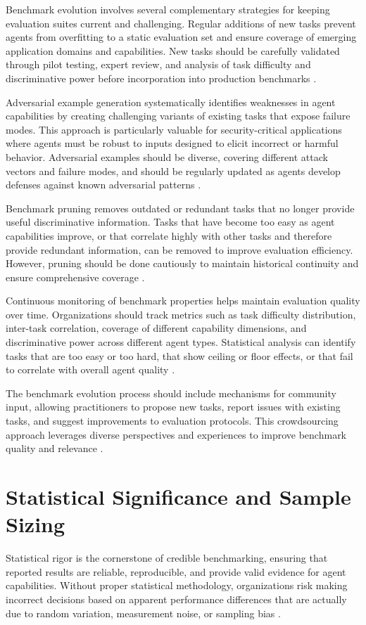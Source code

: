 \begin{TNtwocol}
Benchmark evolution involves several complementary strategies for keeping evaluation suites current and challenging. Regular additions of new tasks prevent agents from overfitting to a static evaluation set and ensure coverage of emerging application domains and capabilities. New tasks should be carefully validated through pilot testing, expert review, and analysis of task difficulty and discriminative power before incorporation into production benchmarks \cite{kiela2021,liu2023,reimers2017}.

Adversarial example generation systematically identifies weaknesses in agent capabilities by creating challenging variants of existing tasks that expose failure modes. This approach is particularly valuable for security-critical applications where agents must be robust to inputs designed to elicit incorrect or harmful behavior. Adversarial examples should be diverse, covering different attack vectors and failure modes, and should be regularly updated as agents develop defenses against known adversarial patterns \cite{putta2024,liu2023}.

Benchmark pruning removes outdated or redundant tasks that no longer provide useful discriminative information. Tasks that have become too easy as agent capabilities improve, or that correlate highly with other tasks and therefore provide redundant information, can be removed to improve evaluation efficiency. However, pruning should be done cautiously to maintain historical continuity and ensure comprehensive coverage \cite{kiela2021,liu2023}.

Continuous monitoring of benchmark properties helps maintain evaluation quality over time. Organizations should track metrics such as task difficulty distribution, inter-task correlation, coverage of different capability dimensions, and discriminative power across different agent types. Statistical analysis can identify tasks that are too easy or too hard, that show ceiling or floor effects, or that fail to correlate with overall agent quality \cite{kiela2021,reimers2017,dror2018}.

The benchmark evolution process should include mechanisms for community input, allowing practitioners to propose new tasks, report issues with existing tasks, and suggest improvements to evaluation protocols. This crowdsourcing approach leverages diverse perspectives and experiences to improve benchmark quality and relevance \cite{kiela2021,liu2023}.

\section{Statistical Significance and Sample Sizing}
Statistical rigor is the cornerstone of credible benchmarking, ensuring that reported results are reliable, reproducible, and provide valid evidence for agent capabilities. Without proper statistical methodology, organizations risk making incorrect decisions based on apparent performance differences that are actually due to random variation, measurement noise, or sampling bias \cite{dror2018,reimers2017,card2020}.


\end{TNtwocol}
